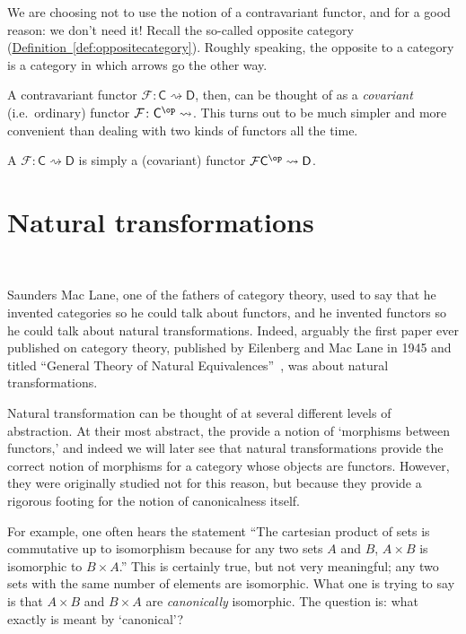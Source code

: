 \documentclass[notes.tex]{subfiles}
\begin{document}
We are choosing not to use the notion of a contravariant functor, and for a good reason: we don't need it! Recall the so-called opposite category (\hyperref[def:oppositecategory]{Definition~\ref*{def:oppositecategory}}). Roughly speaking, the opposite to a category is a category in which arrows go the other way.

A contravariant functor $\mathcal{F}\colon \mathsf{C} \rightsquigarrow \mathsf{D}$, then, can be thought of as a \emph{covariant} (i.e.\ ordinary) functor $\mathcal{F}\colon \mathsf{C}^{\op} \rightsquigarrow$. This turns out to be much simpler and more convenient than dealing with two kinds of functors all the time.

\begin{definition}
  \label{def:contravariant_functor}
  A  $\mathcal{F}\colon \mathsf{C} \rightsquigarrow \mathsf{D}$ is simply a (covariant) functor $\mathcal{F}\mathsf{C}^{\op} \rightsquigarrow \mathsf{D}$.
\end{definition}


\section{Natural transformations}~\label{sec:naturaltransformations}

Saunders Mac Lane, one of the fathers of category theory, used to say that he invented categories so he could talk about functors, and he invented functors so he could talk about natural transformations. Indeed, arguably the first paper ever published on category theory, published by Eilenberg and Mac Lane in 1945 and titled ``General Theory of Natural Equivalences''~\cite{awodey-intro-to-categories}, was about natural transformations.

Natural transformation can be thought of at several different levels of abstraction. At their most abstract, the provide a notion of `morphisms between functors,' and indeed we will later see that natural transformations provide the correct notion of morphisms for a category whose objects are functors. However, they were originally studied not for this reason, but because they provide a rigorous footing for the notion of canonicalness itself.

For example, one often hears the statement ``The cartesian product of sets is commutative up to isomorphism because for any two sets $A$ and $B$, $A \times B$ is isomorphic to $B \times A$.'' This is certainly true, but not very meaningful; any two sets with the same number of elements are isomorphic. What one is trying to say is that $A \times B$ and $B \times A$ are \emph{canonically} isomorphic. The question is: what exactly is meant by `canonical'?
\end{document}
